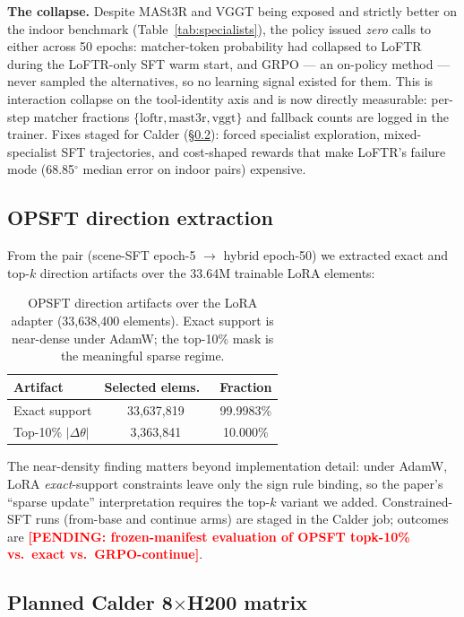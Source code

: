 \documentclass[10pt,twocolumn,letterpaper]{article}
\newcommand{\pending}[1]{\textcolor{red}{\textbf{[PENDING: #1]}}}
\begin{document}
\textbf{The collapse.} Despite MASt3R and VGGT being exposed and strictly
better on the indoor benchmark (Table~\ref{tab:specialists}), the policy
issued \emph{zero} calls to either across 50 epochs: matcher-token
probability had collapsed to LoFTR during the LoFTR-only SFT warm start,
and GRPO — an on-policy method — never sampled the alternatives, so no
learning signal existed for them. This is interaction collapse on the
tool-identity axis and is now directly measurable: per-step matcher
fractions $\{\text{loftr}, \text{mast3r}, \text{vggt}\}$ and fallback
counts are logged in the trainer. Fixes staged for Calder
(\S\ref{sec:calder-plan}): forced specialist exploration, mixed-specialist
SFT trajectories, and cost-shaped rewards that make LoFTR's failure mode
(68.85$^\circ$ median error on indoor pairs) expensive.

\subsection{OPSFT direction extraction}
\label{sec:support-density}

From the pair (scene-SFT epoch-5 $\to$ hybrid epoch-50) we extracted exact
and top-$k$ direction artifacts over the 33.64M trainable LoRA elements:

\begin{table}[h]
\centering\small
\caption{OPSFT direction artifacts over the LoRA adapter
(33,638,400 elements). Exact support is near-dense under AdamW; the
top-10\% mask is the meaningful sparse regime.}
\label{tab:opsft}
\begin{tabular}{lcc}
\toprule
Artifact & Selected elems.\ & Fraction \\
\midrule
Exact support & 33,637,819 & 99.9983\% \\
Top-10\% $|\Delta\theta|$ & 3,363,841 & 10.000\% \\
\bottomrule
\end{tabular}
\end{table}

The near-density finding matters beyond implementation detail: under
AdamW, LoRA \emph{exact}-support constraints leave only the sign rule
binding, so the paper's ``sparse update'' interpretation requires the
top-$k$ variant we added. Constrained-SFT runs (from-base and continue
arms) are staged in the Calder job; outcomes are \pending{frozen-manifest
evaluation of OPSFT topk-10\% vs.\ exact vs.\ GRPO-continue}.

\subsection{Planned Calder 8$\times$H200 matrix}
\label{sec:calder-plan}
\end{document}
